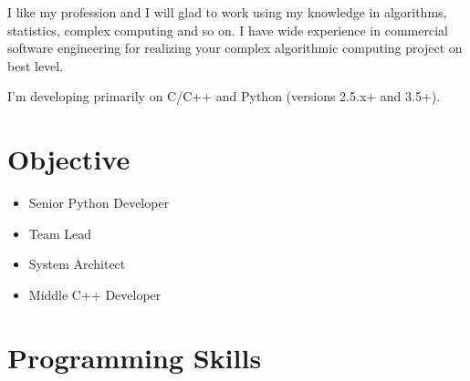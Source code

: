 \documentclass[letterpaper,11pt]{article}
\begin{document}
I like my profession and I will glad to work using my knowledge in algorithms, statistics, complex computing and so on. I have wide experience in commercial software engineering for realizing your complex algorithmic computing project on best level.

I'm developing primarily on C/C++ and Python (versions 2.5.x+ and 3.5+).


\section{Objective}
  \begin{itemize}
    \item Senior Python Developer
    \item Team Lead
    \item System Architect
    \item Middle C++ Developer
  \end{itemize}


\section{Programming Skills}
  
\end{document}
